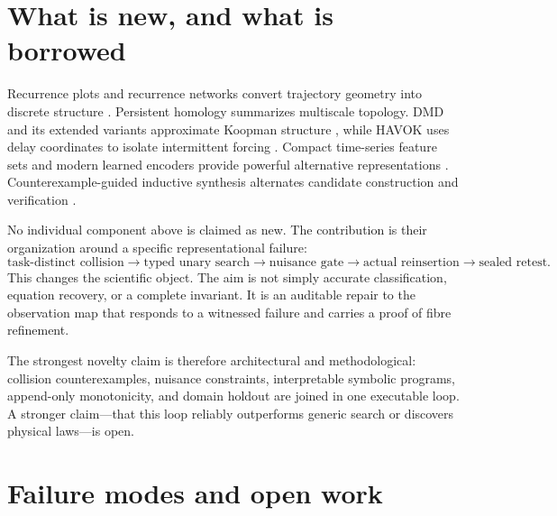\documentclass[10pt]{article}
\theoremstyle{definition}
\theoremstyle{remark}
\begin{document}
\section{What is new, and what is borrowed}
\label{sec:related}

Recurrence plots and recurrence networks convert trajectory geometry into discrete structure \citep{Eckmann1987,Marwan2007,Donner2010,Donges2012}. Persistent homology summarizes multiscale topology. DMD and its extended variants approximate Koopman structure \citep{Schmid2010,Williams2015}, while HAVOK uses delay coordinates to isolate intermittent forcing \citep{Brunton2017}. Compact time-series feature sets and modern learned encoders provide powerful alternative representations \citep{Lubba2019,Dempster2020,Yue2022}. Counterexample-guided inductive synthesis alternates candidate construction and verification \citep{JhaSeshia2017}.

No individual component above is claimed as new. The contribution is their organization around a specific representational failure:
\begin{equation}
  \boxed{
  \text{task-distinct collision}
  \to
  \text{typed unary search}
  \to
  \text{nuisance gate}
  \to
  \text{actual reinsertion}
  \to
  \text{sealed retest}.}
\end{equation}
This changes the scientific object. The aim is not simply accurate classification, equation recovery, or a complete invariant. It is an auditable repair to the observation map that responds to a witnessed failure and carries a proof of fibre refinement.

The strongest novelty claim is therefore architectural and methodological: collision counterexamples, nuisance constraints, interpretable symbolic programs, append-only monotonicity, and domain holdout are joined in one executable loop. A stronger claim---that this loop reliably outperforms generic search or discovers physical laws---is open.

\section{Failure modes and open work}
\label{sec:limits}
\end{document}
